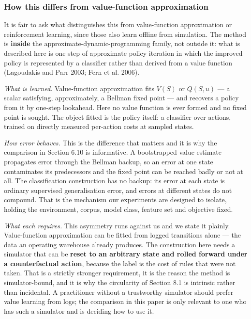 \documentclass[review,3p,times]{elsarticle}
\theoremstyle{definition}
\begin{document}
\subsubsection{How this differs from value-function
approximation}\label{how-this-differs-from-value-function-approximation}

It is fair to ask what distinguishes this from value-function
approximation or reinforcement learning, since those also learn offline
from simulation. The method is \textbf{inside} the
approximate-dynamic-programming family, not outside it: what is
described here is one step of approximate policy iteration in which the
improved policy is represented by a classifier rather than derived from
a value function (Lagoudakis and Parr 2003; Fern et al. 2006).

\emph{What is learned.} Value-function approximation fits \(V(S)\) or
\(Q(S,u)\) --- a scalar satisfying, approximately, a Bellman fixed point
--- and recovers a policy from it by one-step lookahead. Here no value
function is ever formed and no fixed point is sought. The object fitted
is the policy itself: a classifier over actions, trained on directly
measured per-action costs at sampled states.

\emph{How error behaves.} This is the difference that matters and it is
why the comparison in Section 6.10 is informative. A bootstrapped value
estimate propagates error through the Bellman backup, so an error at one
state contaminates its predecessors and the fixed point can be reached
badly or not at all. The classification construction has no backup: its
error at each state is ordinary supervised generalisation error, and
errors at different states do not compound. That is the mechanism our
experiments are designed to isolate, holding the environment, corpus,
model class, feature set and objective fixed.

\emph{What each requires.} This asymmetry runs against us and we state
it plainly. Value-function approximation can be fitted from logged
transitions alone --- the data an operating warehouse already produces.
The construction here needs a simulator that can be \textbf{reset to an
arbitrary state and rolled forward under a counterfactual action},
because the label is the cost of rules that were not taken. That is a
strictly stronger requirement, it is the reason the method is
simulator-bound, and it is why the circularity of Section 8.1 is
intrinsic rather than incidental. A practitioner without a trustworthy
simulator should prefer value learning from logs; the comparison in this
paper is only relevant to one who has such a simulator and is deciding
how to use it.
\end{document}
